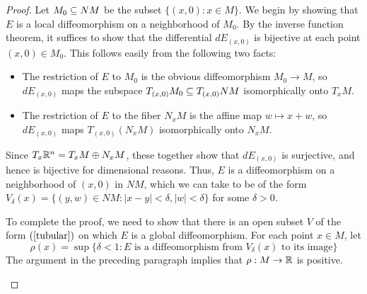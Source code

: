 \begin{proof}
Let $M_0\subseteq NM$ be the subset $\{(x,0):x\in M\}$. We begin by showing that $E$ is a local diffeomorphism on a neighborhood of $M_0$. By the inverse function theorem, it suffices to show that the differential $dE_{(x,0)}$ is bijective at each point $(x,0)\in M_0$. This follows easily from the following two facts: 
\begin{itemize}
\item The restriction of $E$ to $M_0$ is the obvious diffeomorphism $M_0\to M$, so $dE_{(x,0)}$ maps the subspace $T_{(x,0)}M_0\subseteq T_{(x,0)}NM$ isomorphically onto $T_xM$.
\item The restriction of $E$ to the fiber $N_xM$ is the affine map $w\mapsto x+w$, so $dE_{(x,0)}$ maps $T_{(x,0)}(N_xM)$ isomorphically onto $N_xM$.
\end{itemize}  
Since $T_x\mathbb{R}^n=T_xM\oplus N_xM$, these together show that $dE_{(x,0)}$ is surjective, and hence is bijective for dimensional reasons. Thus, $E$ is a diffeomorphism on a neighborhood of $(x,0)$ in $NM$, which we can take to be of the form $V_\delta(x)=\{(y,w)\in NM:|x-y|<\delta,|w|<\delta\}$ for some $\delta>0$.\par
To complete the proof, we need to show that there is an open subset $V$ of the form $(\ref{tubular})$ on which $E$ is a global diffeomorphism. For each point $x\in M$, let 
\[\rho(x)=\sup\{\delta<1:E\text{ is a diffeomorphism from $V_\delta(x)$ to its image}\}\]
The argument in the preceding paragraph implies that $\rho:M\to\mathbb{R}$ is positive.
\begin{figure}[htbp]
\centering

\end{figure}
\end{proof}
